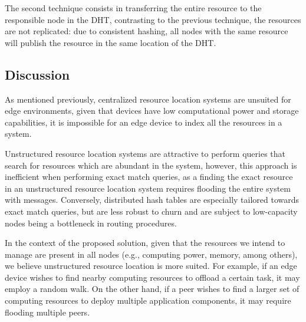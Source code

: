 The second technique consists in transferring the entire resource to the responsible node in the DHT, contrasting to the previous technique, the resources are not replicated: due to consistent hashing, all nodes with the same resource will publish the resource in the same location of the DHT. 

\subsection{Discussion}

As mentioned previously, centralized resource location systems are unsuited for edge environments, given that devices have low computational power and storage capabilities, it is impossible for an edge device to index all the resources in a system.

Unstructured resource location systems are attractive to perform queries that search for resources which are abundant in the system, however, this approach is inefficient when performing exact match queries, as a finding the exact resource in an unstructured resource location system requires flooding the entire system with messages. Conversely, distributed hash tables are especially tailored towards exact match queries, but are less robust to churn and are subject to low-capacity nodes being a bottleneck in routing procedures. 

In the context of the proposed solution, given that the resources we intend to manage are present in all nodes (e.g., computing power, memory, among others), we believe unstructured resource location is more suited. For example, if an edge device wishes to find nearby computing resources to offload a certain task, it may employ a random walk. On the other hand, if a peer wishes to find a larger set of computing resources to deploy multiple application components, it may require flooding multiple peers. 






